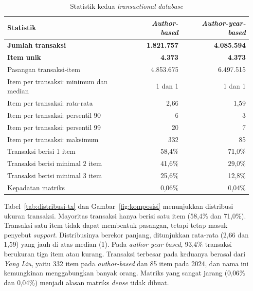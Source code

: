 \begin{table}[ht]
\caption{Statistik kedua \textit{transactional database}}
\label{tab:statistik-tx}
\small
\begin{tabular}{@{}lrr@{}}
\toprule
\textbf{Statistik} & \textbf{\textit{Author-based}} & \textbf{\textit{Author-year-based}} \\
\midrule
\textbf{Jumlah transaksi} & \textbf{1.821.757} & \textbf{4.085.594} \\
\textbf{Item unik} & \textbf{4.373} & \textbf{4.373} \\
Pasangan transaksi-item & 4.853.675 & 6.497.515 \\
Item per transaksi: minimum dan median & 1 dan 1 & 1 dan 1 \\
Item per transaksi: rata-rata & 2,66 & 1,59 \\
Item per transaksi: persentil 90 & 6 & 3 \\
Item per transaksi: persentil 99 & 20 & 7 \\
Item per transaksi: maksimum & 332 & 85 \\
Transaksi berisi 1 item & 58,4\% & 71,0\% \\
Transaksi berisi minimal 2 item & 41,6\% & 29,0\% \\
Transaksi berisi minimal 3 item & 25,6\% & 12,8\% \\
Kepadatan matriks & 0,06\% & 0,04\% \\
\bottomrule
\end{tabular}
\end{table}

Tabel~\ref{tab:distribusi-tx} dan Gambar~\ref{fig:komposisi} menunjukkan distribusi ukuran transaksi. Mayoritas transaksi hanya berisi satu item (58,4\% dan 71,0\%). Transaksi satu item tidak dapat membentuk pasangan, tetapi tetap masuk penyebut \textit{support}. Distribusinya berekor panjang, ditunjukkan rata-rata (2,66 dan 1,59) yang jauh di atas median (1). Pada \textit{author-year-based}, 93,4\% transaksi berukuran tiga item atau kurang. Transaksi terbesar pada keduanya berasal dari \textit{Yang Liu}, yaitu 332 item pada \textit{author-based} dan 85 item pada 2024, dan nama ini kemungkinan menggabungkan banyak orang. Matriks yang sangat jarang (0,06\% dan 0,04\%) menjadi alasan matriks \textit{dense} tidak dibuat.

